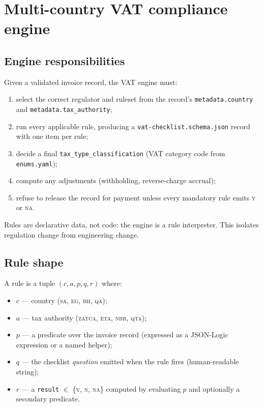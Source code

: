 \chapter{Multi-country VAT compliance engine}\label{ch:vat}

\section{Engine responsibilities}

Given a validated invoice record, the VAT engine must:

\begin{enumerate}
  \item select the correct regulator and ruleset from the record's
        \texttt{metadata.country} and \texttt{metadata.tax\_authority};
  \item run every applicable rule, producing a
        \texttt{vat-checklist.schema.json} record with one item per rule;
  \item decide a final \texttt{tax\_type\_classification} (VAT category
        code from \texttt{enums.yaml});
  \item compute any adjustments (withholding, reverse-charge accrual);
  \item refuse to release the record for payment unless every
        mandatory rule emits \textsc{y} or \textsc{na}.
\end{enumerate}

Rules are declarative data, not code: the engine is a rule interpreter.
This isolates regulation change from engineering change.

\section{Rule shape}

A rule is a tuple \mbox{$(c, a, p, q, r)$} where:
\begin{itemize}
  \item $c$ --- country (\textsc{sa}, \textsc{eg}, \textsc{bh}, \textsc{qa});
  \item $a$ --- tax authority (\textsc{zatca}, \textsc{eta}, \textsc{nbr}, \textsc{qta});
  \item $p$ --- a predicate over the invoice record (expressed as a JSON-Logic
              expression or a named helper);
  \item $q$ --- the checklist \emph{question} emitted when the rule fires
              (human-readable string);
  \item $r$ --- a \texttt{result} $\in$ \{\textsc{y}, \textsc{n}, \textsc{na}\}
              computed by evaluating $p$ and optionally a secondary predicate.
\end{itemize}

